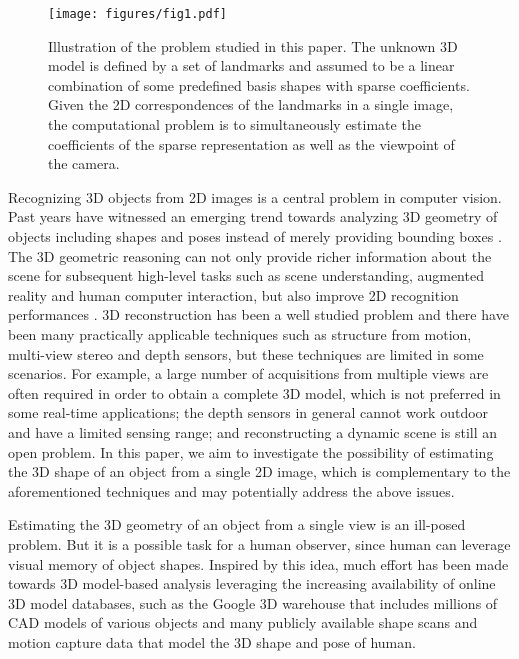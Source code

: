 \documentclass[10pt,journal,cspaper,compsoc]{IEEEtran}
\begin{document}
\begin{figure*}
  \centering
\texttt{[image: figures/fig1.pdf]}\\
  \caption{Illustration of the problem studied in this paper. The unknown 3D model is defined by a set of landmarks and assumed to be a linear combination of some predefined basis shapes with sparse coefficients. Given the 2D correspondences of the landmarks in a single image, the computational problem is to simultaneously estimate the coefficients of the sparse representation as well as the viewpoint of the camera.  }\label{fig:illustration}
\end{figure*}

Recognizing 3D objects from 2D images is a central problem in computer vision. Past years have witnessed an emerging trend towards analyzing 3D geometry of objects including shapes and poses instead of merely providing bounding boxes \cite{xiang2012estimating,aubry2014seeing}. The 3D geometric reasoning can not only provide richer information about the scene for subsequent high-level tasks such as scene understanding, augmented reality and human computer interaction, but also improve 2D recognition performances \cite{fidler20123d,simo2013joint}. 3D reconstruction has been a well studied problem and there have been many practically applicable techniques such as structure from motion, multi-view stereo and depth sensors, but these techniques are limited in some scenarios. For example, a large number of acquisitions from multiple views are often required in order to obtain a complete 3D model, which is not preferred in some real-time applications; the depth sensors in general cannot work outdoor and have a limited sensing range; and reconstructing a dynamic scene is still an open problem. In this paper, we aim to investigate the possibility of estimating the 3D shape of an object from a single 2D image, which is complementary to the aforementioned techniques and may potentially address the above issues.

Estimating the 3D geometry of an object from a single view is an ill-posed problem. But it is a possible task for a human observer, since human can leverage visual memory of object shapes. Inspired by this idea, much effort has been made towards 3D model-based analysis leveraging the increasing availability of online 3D model databases, such as the Google 3D warehouse that includes millions of CAD models of various objects and many publicly available shape scans and motion capture data that model the 3D shape and pose of human.
\end{document}
